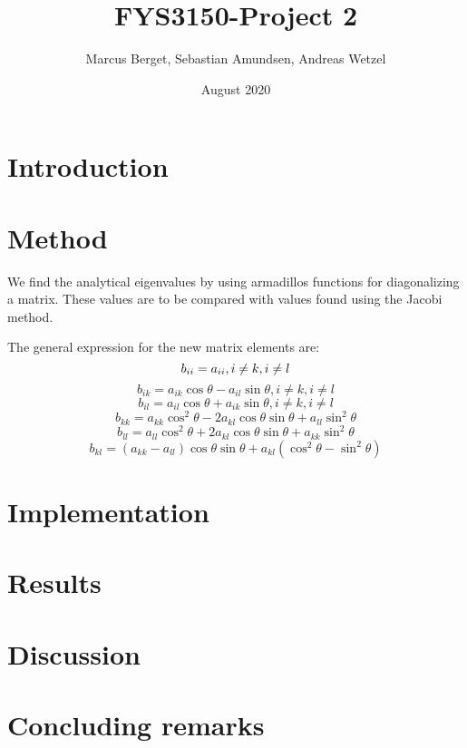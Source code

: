 \documentclass[norsk,a4paper,12pt]{article}
\begin{document}
\title{FYS3150-Project 2}
\author{Marcus Berget, Sebastian Amundsen, Andreas Wetzel}
\date{August 2020}
\maketitle

\begin{abstract}

\end{abstract}

\section{Introduction}

\section{Method}

We find the analytical eigenvalues by using armadillos functions for diagonalizing a matrix. These values are to be compared with values found using the Jacobi method. 

The general expression for the new matrix elements are:
$$
b_{ii}=a_{ii}, i\neq k, i\neq l \\
$$
$$
b_{ik}=a_{ik}\cos \theta - a_{il}\sin \theta, i\neq k, i\neq l
$$
$$
b_{il}=a_{il}\cos\theta+a_{ik}\sin\theta, i\neq k, i\neq l
$$
$$
b_{kk}=a_{kk} \cos^2\theta - 2a_{kl}\cos\theta \sin\theta + a_{ll}\sin^2\theta
$$
$$
b_{ll}=a_{ll}\cos^2\theta+2a_{kl}\cos\theta \sin\theta + a_{kk}\sin^2\theta
$$
\begin{equation}
b_{kl} = (a_{kk}-a_{ll})\cos\theta\sin\theta+a_{kl}(\cos^2\theta-\sin^2\theta)
 \label{eq:Jacob}
 \end{equation}

\section{Implementation}



\section{Results}

\section{Discussion}


\section{Concluding remarks}


\end{document}
